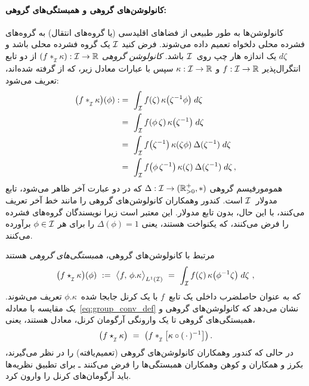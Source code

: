 \paragraph{کانولوشن‌های گروهی و همبستگی‌های گروهی:}
کانولوشن‌ها به طور طبیعی از فضاهای اقلیدسی (یا گروه‌های انتقال) به گروه‌های فشرده محلی دلخواه تعمیم داده می‌شوند.
فرض کنید $\mathcal{I}$ یک گروه فشرده محلی باشد و $d\zeta$ یک اندازه هار چپ روی~$\mathcal{I}$ باشد.
\emph{کانولوشن گروهی} $(f \ast_{\overset{}{\protect\scalebox{.64}{$\mkern-.5mu \I$}}} \kappa): \I \to \R$ از دو تابع انتگرال‌پذیر $f:\mathcal{I}\to\mathbb{R}$ و $\kappa:\mathcal{I}\to\mathbb{R}$ سپس با عبارات معادل زیر، که از \cite{gallier2019harmonicRepr} گرفته شده‌اند، تعریف می‌شود:
\begin{align}\label{eq:group_conv_def}
	\big(f \ast_{\overset{}{\protect\scalebox{.64}{$\mkern-.5mu \I$}}} \kappa \big)(\phi)
	:&=\ \int_{\I} f(\zeta)\, \kappa\big( \zeta^{-1} \phi \big) \; d\zeta \notag \\
	&=\ \int_{\I} f(\phi\, \zeta)\, \kappa\big( \zeta^{-1}\big) \; d\zeta \notag \\
	&=\ \int_{\I} f\big(\zeta^{-1} \big)\, \kappa( \zeta\phi)\: \Delta(\zeta^{-1}) \; d\zeta \notag \\
	&=\ \int_{\I} f\big(\phi\, \zeta^{-1} \big)\, \kappa( \zeta)\: \Delta(\zeta^{-1}) \; d\zeta \,,
\end{align}
همومورفیسم گروهی $\Delta: \mathcal{I} \to (\mathbb{R}^+_{>0},*)$ که در دو عبارت آخر ظاهر می‌شود، تابع مدولار~$\mathcal{I}$ است.
کندور وهمکاران\cite{Kondor2018-GENERAL} کانولوشن‌های گروهی را مانند خط آخر تعریف می‌کنند، با این حال، بدون تابع مدولار.
این معتبر است زیرا نویسندگان گروه‌های فشرده را فرض می‌کنند، که یکنواخت هستند، یعنی $\Delta(\phi) = 1$ را برای هر $\phi \in\mathcal{I}$ برآورده می‌کنند.


مرتبط با کانولوشن‌های گروهی، \emph{همبستگی‌های گروهی} هستند
\begin{align}\label{eq:group_corr_def}
	\big(f \star_{\overset{}{\protect\scalebox{.64}{$\mkern-.5mu \I$}}} \kappa \big)(\phi)
	\ :=\ \big\langle f,\, \phi.\kappa \big\rangle_{L^1(\I)}
	\ =\ \int_{\I} f(\zeta)\, \kappa\big( \phi^{-1} \zeta \big) \; d\zeta\ ,
\end{align}
که به عنوان حاصلضرب داخلی یک تابع~$f$ با یک کرنل جابجا شده~$\phi.\kappa$ تعریف می‌شوند.
یک مقایسه با معادله~\eqref{eq:group_conv_def} نشان می‌دهد که کانولوشن‌های گروهی و همبستگی‌های گروهی تا یک وارونگی آرگومان کرنل، معادل هستند، یعنی،
\begin{align}\label{eq:group_conv_corr_kernel_inversion}
	\big(f \star_{\overset{}{\protect\scalebox{.64}{$\mkern-.5mu \I$}}} \kappa \big)
	\ =\ \big(f \ast_{\overset{}{\protect\scalebox{.64}{$\mkern-.5mu \I$}}} \big[\kappa \circ (\,\cdot\,)^{-1} \big] \big) \,.
\end{align}
در حالی که کندور وهمکاران\cite{Kondor2018-GENERAL} کانولوشن‌های گروهی (تعمیم‌یافته) را در نظر می‌گیرند، بکرز و همکاران\cite{bekkers2020bspline} و کوهن وهمکاران\cite{Cohen2019-generaltheory} همبستگی‌ها را فرض می‌کنند ـ برای تطبیق نظریه‌ها باید آرگومان‌های کرنل را وارون کرد.


